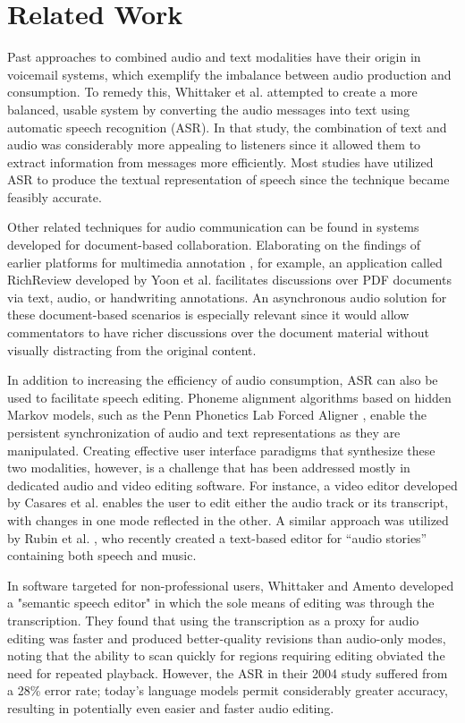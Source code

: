 \documentclass{sigchi}
\begin{document}
\section{Related Work}
Past approaches to combined audio and text modalities have their origin in voicemail systems, which exemplify the imbalance between audio production and consumption. 
To remedy this, Whittaker et al. \cite{whittaker} attempted to create a more balanced, usable system by converting the audio messages into text using automatic speech recognition (ASR). 
In that study, the combination of text and audio was considerably more appealing to listeners since it allowed them to extract information from messages more efficiently. 
Most studies have utilized ASR to produce the textual representation of speech since the technique became feasibly accurate.

Other related techniques for audio communication can be found in systems developed for document-based collaboration. 
Elaborating on the findings of earlier platforms for multimedia annotation \cite{bargeron}, for example, an application called RichReview developed by Yoon et al. \cite{yoon} facilitates discussions over PDF documents via text, audio, or handwriting annotations. 
An asynchronous audio solution for these document-based scenarios is especially relevant since it would allow commentators to have richer discussions over the document material without visually distracting from the original content. 

In addition to increasing the efficiency of audio consumption, ASR can also be used to facilitate speech editing. 
Phoneme alignment algorithms based on hidden Markov models, such as the Penn Phonetics Lab Forced Aligner \cite{p2fa}, enable the persistent synchronization of audio and text representations as they are manipulated. 
Creating effective user interface paradigms that synthesize these two modalities, however, is a challenge that has been addressed mostly in dedicated audio and video editing software. 
For instance, a video editor developed by Casares et al. \cite{casares} enables the user to edit either the audio track or its transcript, with changes in one mode reflected in the other. 
A similar approach was utilized by Rubin et al. \cite{rubin}, who recently created a text-based editor for ``audio stories'' containing both speech and music.

In software targeted for non-professional users, Whittaker and Amento \cite{whittaker_semantic} developed a "semantic speech editor" in which the sole means of editing was through the transcription. 
They found that using the transcription as a proxy for audio editing was faster and produced better-quality revisions than audio-only modes, noting that the ability to scan quickly for regions requiring editing obviated the need for repeated playback. 
However, the ASR in their 2004 study suffered from a 28\% error rate; today's language models permit considerably greater accuracy, resulting in potentially even easier and faster audio editing.
\end{document}
